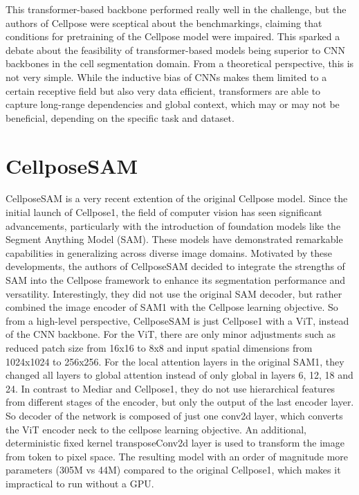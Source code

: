 This transformer-based backbone performed really well in the challenge, but the authors of Cellpose were sceptical about the benchmarkings, claiming that conditions for pretraining of the Cellpose model were impaired. This sparked a debate about the feasibility of transformer-based models being superior to CNN backbones in the cell segmentation domain. From a theoretical perspective, this is not very simple. While the inductive bias of CNNs makes them limited to a certain receptive field but also very data efficient, transformers are able to capture long-range dependencies and global context, which may or may not be beneficial, depending on the specific task and dataset.


\section{CellposeSAM}

CellposeSAM is a very recent extention of the original Cellpose model. Since the initial launch of Cellpose1, the field of computer vision has seen significant advancements, particularly with the introduction of foundation models like the Segment Anything Model (SAM). These models have demonstrated remarkable capabilities in generalizing across diverse image domains. Motivated by these developments, the authors of CellposeSAM decided to integrate the strengths of SAM into the Cellpose framework to enhance its segmentation performance and versatility. Interestingly, they did not use the original SAM decoder, but rather combined the image encoder of SAM1 with the Cellpose learning objective. So from a high-level perspective, CellposeSAM is just Cellpose1 with a ViT, instead of the CNN backbone. For the ViT, there are only minor adjustments such as reduced patch size from 16x16 to 8x8 and input spatial dimensions from 1024x1024 to 256x256. For the local attention layers in the original SAM1, they changed all layers to global attention instead of only global in layers 6, 12, 18 and 24. In contrast to Mediar and Cellpose1, they do not use hierarchical features from different stages of the encoder, but only the output of the last encoder layer. So decoder of the network is composed of just one conv2d layer, which converts the ViT encoder neck to the cellpose learning objective. An additional, deterministic fixed kernel transposeConv2d layer is used to transform the image from token to pixel space. The resulting model with an order of magnitude more parameters (305M vs 44M) compared to the original Cellpose1, which makes it impractical to run without a GPU. 

